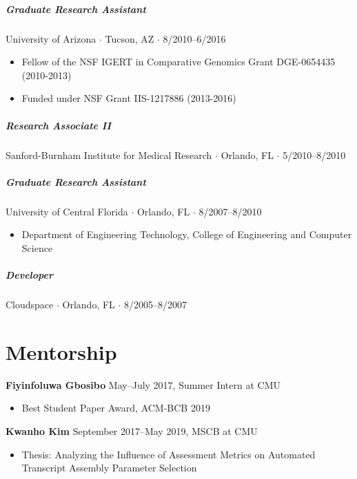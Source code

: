 \documentclass[10pt,letterpaper]{article}
\newcommand{\bigdot}{$\cdot$\xspace}
\begin{document}
\subparagraph{Graduate Research Assistant}
University of Arizona \bigdot Tucson, AZ \bigdot 8/2010--6/2016 
\begin{itemize}
    \item Fellow of the NSF IGERT in Comparative Genomics Grant DGE-0654435 (2010-2013)
    \item Funded under NSF Grant IIS-1217886 (2013-2016)
\end{itemize}

\subparagraph{Research Associate II}
Sanford-Burnham Institute for Medical Research \bigdot Orlando, FL \bigdot 5/2010--8/2010 

\subparagraph{Graduate Research Assistant}
University of Central Florida \bigdot Orlando, FL \bigdot 8/2007--8/2010 
\begin{itemize}
    \item Department of Engineering Technology, College of Engineering and Computer Science
\end{itemize}

\subparagraph{Developer}
Cloudspace \bigdot Orlando, FL \bigdot 8/2005--8/2007 


\section*{Mentorship}
\hspace{1.5em}\textbf{Fiyinfoluwa Gbosibo} May--July 2017, Summer Intern at CMU
\begin{itemize}
\item Best Student Paper Award, ACM-BCB 2019
\end{itemize}

\textbf{Kwanho Kim} September 2017--May 2019, MSCB at CMU
\begin{itemize}
\item Thesis: Analyzing the Influence of Assessment Metrics on Automated Transcript Assembly Parameter Selection
\end{itemize}
\end{document}
